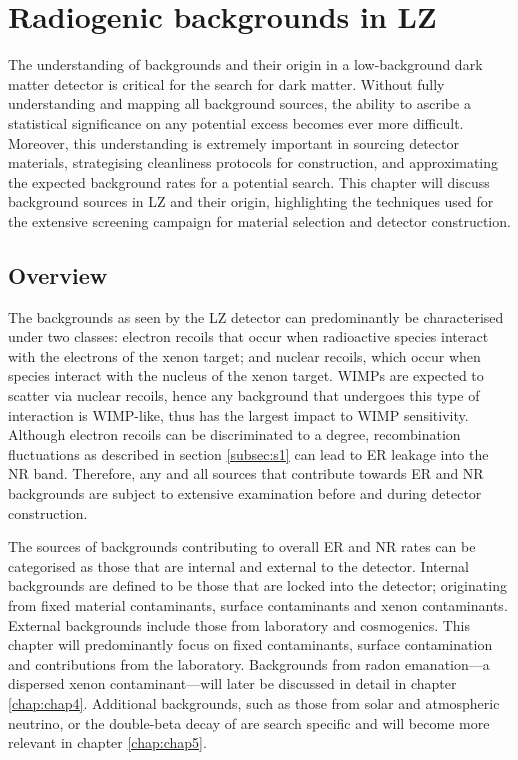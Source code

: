 \chapter{Radiogenic backgrounds in LZ}
\label{chap:chap3}

The understanding of backgrounds and their origin in a low-background dark matter detector is critical for the search for dark matter. Without fully understanding and mapping all background sources, the ability to ascribe a statistical significance on any potential excess becomes ever more difficult. Moreover, this understanding is extremely important in sourcing detector materials, strategising cleanliness protocols for construction, and approximating the expected background rates for a potential search. This chapter will discuss background sources in LZ and their origin, highlighting the techniques used for the extensive screening campaign for material selection and detector construction.  

\section{Overview}

The backgrounds as seen by the LZ detector can predominantly be characterised under two classes: electron recoils that occur when radioactive species interact with the electrons of the xenon target; and nuclear recoils, which occur when species interact with the nucleus of the xenon target. WIMPs are expected to scatter via nuclear recoils, hence any background that undergoes this type of interaction is WIMP-like, thus has the largest impact to WIMP sensitivity. Although electron recoils can be discriminated to a degree, recombination fluctuations as described in section \ref{subsec:s1} can lead to ER leakage into the NR band. Therefore, any and all sources that contribute towards ER and NR backgrounds are subject to extensive examination before and during detector construction.

The sources of backgrounds contributing to overall ER and NR rates can be categorised as those that are internal and external to the detector. Internal backgrounds are defined to be those that are locked into the detector; originating from fixed material contaminants, surface contaminants and xenon contaminants. External backgrounds include those from laboratory and cosmogenics. This chapter will predominantly focus on fixed contaminants, surface contamination and contributions from the laboratory. Backgrounds from radon emanation---a dispersed xenon contaminant---will later be discussed in detail in chapter \ref{chap:chap4}. Additional backgrounds, such as those from solar and atmospheric neutrino, or the double-beta decay of \XeOTSeven{} are search specific and will become more relevant in chapter \ref{chap:chap5}.

